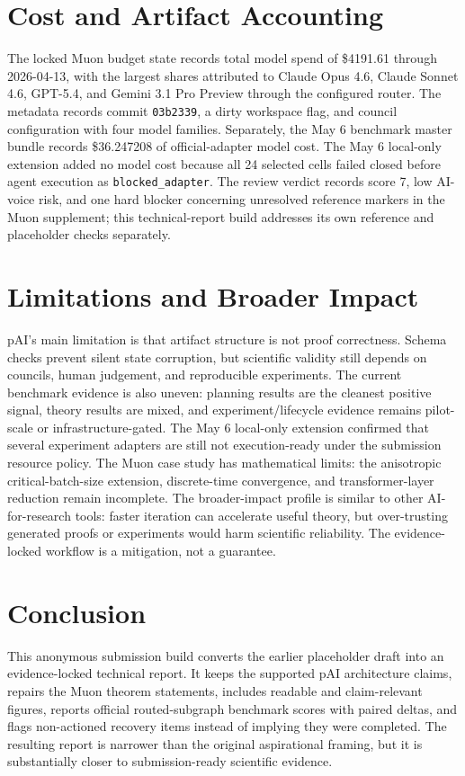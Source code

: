 \documentclass{article}
\begin{document}
\section{Cost and Artifact Accounting}
The locked Muon budget state records total model spend of \$4191.61 through 2026-04-13, with the largest shares attributed to Claude Opus 4.6, Claude Sonnet 4.6, GPT-5.4, and Gemini 3.1 Pro Preview through the configured router. The metadata records commit \texttt{03b2339}, a dirty workspace flag, and council configuration with four model families. Separately, the May 6 benchmark master bundle records \$36.247208 of official-adapter model cost. The May 6 local-only extension added no model cost because all 24 selected cells failed closed before agent execution as \texttt{blocked\_adapter}. The review verdict records score 7, low AI-voice risk, and one hard blocker concerning unresolved reference markers in the Muon supplement; this technical-report build addresses its own reference and placeholder checks separately.

\section{Limitations and Broader Impact}
pAI's main limitation is that artifact structure is not proof correctness. Schema checks prevent silent state corruption, but scientific validity still depends on councils, human judgement, and reproducible experiments. The current benchmark evidence is also uneven: planning results are the cleanest positive signal, theory results are mixed, and experiment/lifecycle evidence remains pilot-scale or infrastructure-gated. The May 6 local-only extension confirmed that several experiment adapters are still not execution-ready under the submission resource policy. The Muon case study has mathematical limits: the anisotropic critical-batch-size extension, discrete-time convergence, and transformer-layer reduction remain incomplete. The broader-impact profile is similar to other AI-for-research tools: faster iteration can accelerate useful theory, but over-trusting generated proofs or experiments would harm scientific reliability. The evidence-locked workflow is a mitigation, not a guarantee.

\section{Conclusion}
This anonymous submission build converts the earlier placeholder draft into an evidence-locked technical report. It keeps the supported pAI architecture claims, repairs the Muon theorem statements, includes readable and claim-relevant figures, reports official routed-subgraph benchmark scores with paired deltas, and flags non-actioned recovery items instead of implying they were completed. The resulting report is narrower than the original aspirational framing, but it is substantially closer to submission-ready scientific evidence.
\end{document}
